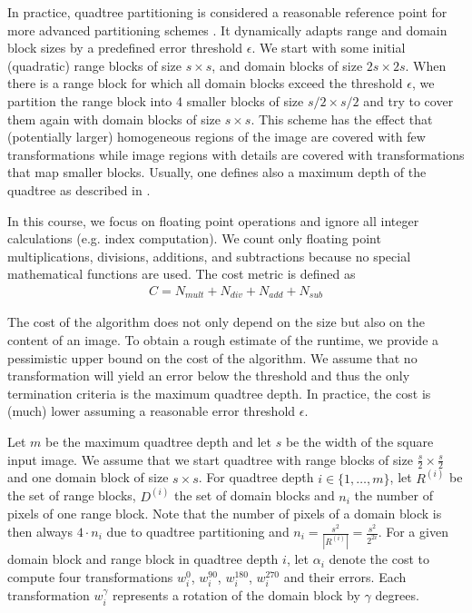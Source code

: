  In practice, quadtree partitioning is considered
a reasonable reference point for more advanced partitioning schemes
\cite{fisher2012}. It dynamically adapts range and domain block sizes by a
predefined error threshold $\epsilon$. We start with some initial (quadratic)
range blocks of size $s \times s$, and domain blocks of size $2s \times 2s$.
When there is a range block for which all domain blocks exceed the threshold
$\epsilon$, we partition the range block into 4 smaller blocks of size
$s/2 \times s/2$ and try to cover them again with domain blocks of size
$s \times s$. This scheme has the effect that (potentially larger) homogeneous
regions of the image are covered with few transformations while image regions
with details are covered with transformations that map smaller blocks. Usually,
one defines also a maximum depth of the quadtree as described in
\cite{fisher2012}.

 In this course, we focus on floating point operations and
ignore all integer calculations (e.g. index computation). We count only floating
point multiplications, divisions, additions, and subtractions because no special
mathematical functions are used. The cost metric is defined as
\begin{align}
  C = N_{mult} + N_{div} + N_{add} + N_{sub} \label{eq:cost}
\end{align}

The cost of the algorithm does not only depend on the size but also on the content
of an image. To obtain a rough estimate of the runtime, we provide a
pessimistic upper bound on the cost of the algorithm. We assume that no transformation
will yield an error below the threshold and thus the only termination criteria is the
maximum quadtree depth. In practice, the cost is (much) lower assuming a reasonable
error threshold $\epsilon$.

Let $m$ be the maximum quadtree depth and let $s$ be the width of the square
input image. We assume that we start quadtree with range blocks of size
$\frac{s}{2}\times\frac{s}{2}$ and one domain block of size $s \times s$. For
quadtree depth $i \in \{1, \dots, m\}$, let $R^{(i)}$ be the set of range
blocks, $D^{(i)}$ the set of domain blocks and $n_{i}$ the number of pixels of
one range block. Note that the number of pixels of a domain block is then always
$4\cdot n_{i}$ due to quadtree partitioning and $n_i=\frac{s^2}{|R^{(i)}|} = \frac{s^2}{2^{2i}}$.
For a given domain block and range block in quadtree depth $i$,
let $\alpha_{i}$ denote the cost to compute four transformations $w_i^{0}$,
$w_i^{90}$, $w_i^{180}$, $w_i^{270}$ and their errors. Each transformation
$w_i^{\gamma}$ represents a rotation of the domain block by $\gamma$ degrees.

